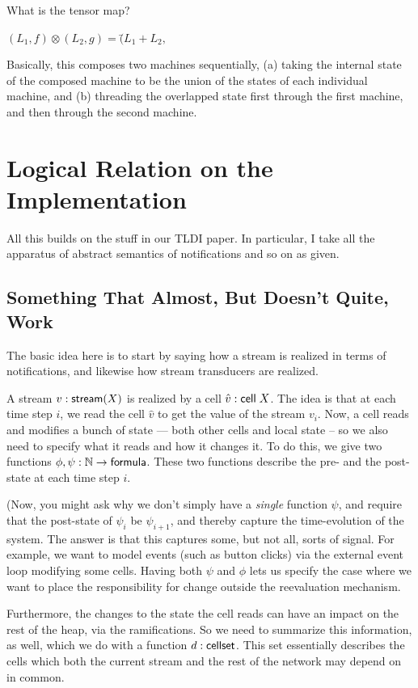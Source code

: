 \documentclass{article}
\begin{document}
What is the tensor map?

\begin{specification}
  \nextline $(L_1, f) \otimes (L_2, g) = ($\=$L_1 + L_2, $
\end{specification}

Basically, this composes two machines sequentially, (a) taking the
internal state of the composed machine to be the union of the states
of each individual machine, and (b) threading the overlapped state
first through the first machine, and then through the second machine.

\section{Logical Relation on the Implementation}

All this builds on the stuff in our TLDI paper. In particular, I take
all the apparatus of abstract semantics of notifications and so on as 
given. 

\subsection{Something That Almost, But Doesn't Quite, Work}

The basic idea here is to start by saying how a stream is realized in 
terms of notifications, and likewise how stream transducers are realized. 

A stream $v : \mathsf{stream}({X})$ is realized by a cell $\hat{v} :
\mathsf{cell}\;{X}$. The idea is that at each time step $i$, we read the
cell $\hat{v}$ to get the value of the stream $v_i$. Now, a cell reads
and modifies a bunch of state --- both other cells and local state --
so we also need to specify what it reads and how it changes it. To 
do this, we give two functions $\phi, \psi : \mathbb{N} \to \mathsf{formula}$. 
These two functions describe the pre- and the post-state at each 
time step $i$. 

(Now, you might ask why we don't simply have a \emph{single} function
$\psi$, and require that the post-state of $\psi_i$ be $\psi_{i+1}$,
and thereby capture the time-evolution of the system. The answer is
that this captures some, but not all, sorts of signal. For example, we
want to model events (such as button clicks) via the external event
loop modifying some cells. Having both $\psi$ and $\phi$ lets us
specify the case where we want to place the responsibility for change
outside the reevaluation mechanism. 

Furthermore, the changes to the state the cell reads can have an
impact on the rest of the heap, via the ramifications. So we need to
summarize this information, as well, which we do with a function $d :
\mathsf{cellset}$.  This set essentially describes the cells which both the
current stream and the rest of the network may depend on in common. 
\end{document}
